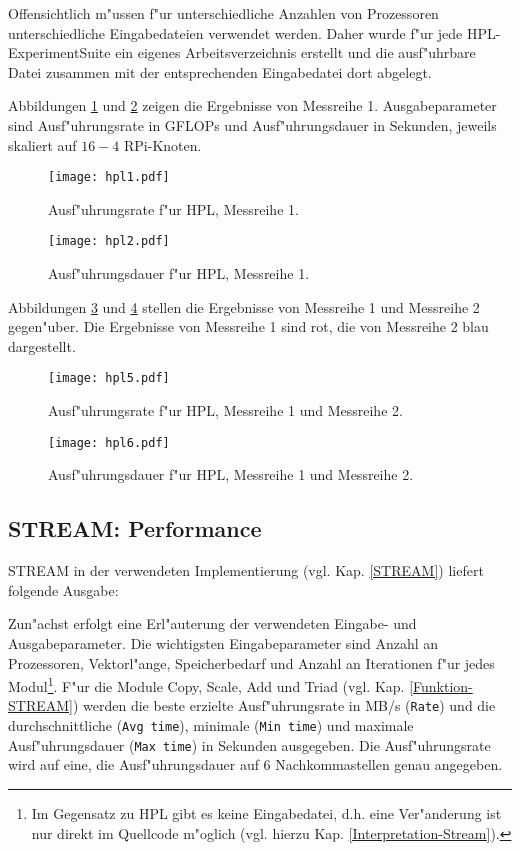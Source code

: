 Offensichtlich m"ussen f"ur unterschiedliche Anzahlen von Prozessoren unterschiedliche Eingabedateien verwendet werden. Daher wurde f"ur jede HPL-ExperimentSuite ein eigenes Arbeitsverzeichnis erstellt und die ausf"uhrbare Datei zusammen mit der entsprechenden Eingabedatei dort abgelegt. 

Abbildungen \ref{fig:hpl1} und \ref{fig:hpl2} zeigen die Ergebnisse von Messreihe 1. Ausgabeparameter sind Ausf"uhrungsrate in GFLOPs und Ausf"uhrungsdauer in Sekunden, jeweils skaliert auf $16-4$ RPi-Knoten.
\begin{figure}[H]
  \centering
  \texttt{[image: hpl1.pdf]}\\ 
  \caption{Ausf"uhrungsrate f"ur HPL, Messreihe 1.}
  \label{fig:hpl1}		
\end{figure}
\begin{figure}[H]
  \centering
  \texttt{[image: hpl2.pdf]}\\ 
  \caption{Ausf"uhrungsdauer f"ur HPL, Messreihe 1.}
  \label{fig:hpl2}		
\end{figure}
\noindent
Abbildungen \ref{fig:hpl5} und \ref{fig:hpl6} stellen die Ergebnisse von Messreihe 1 und Messreihe 2 gegen"uber. Die Ergebnisse von Messreihe 1 sind rot, die von Messreihe 2 blau dargestellt.
\begin{figure}[htb]
  \centering
  \texttt{[image: hpl5.pdf]}\\ 
  \caption{Ausf"uhrungsrate f"ur HPL, Messreihe 1 und Messreihe 2.}\label{fig:hpl5}
\end{figure}
\begin{figure}[H]
  \centering
  \texttt{[image: hpl6.pdf]}\\ 
  \caption{Ausf"uhrungsdauer f"ur HPL, Messreihe 1 und Messreihe 2.}\label{fig:hpl6}
\end{figure}
\subsection{STREAM: Performance}\label{Ergebnisse-STREAM}
STREAM in der verwendeten Implementierung (vgl. Kap. \ref{STREAM}) liefert folgende Ausgabe:

Zun"achst erfolgt eine Erl"auterung der verwendeten Eingabe- und Ausgabeparameter. Die wichtigsten Eingabeparameter sind Anzahl an Prozessoren, Vektorl"ange, Speicherbedarf und Anzahl an Iterationen f"ur jedes Modul\footnote{Im Gegensatz zu HPL gibt es keine Eingabedatei, d.h. eine Ver"anderung ist nur direkt im Quellcode m"oglich (vgl. hierzu Kap. \ref{Interpretation-Stream}).}. F"ur die Module Copy, Scale, Add und Triad (vgl. Kap. \ref{Funktion-STREAM}) werden die beste erzielte Ausf"uhrungsrate in MB/s (\texttt{Rate}) und die durchschnittliche (\texttt{Avg time}), minimale (\texttt{Min time}) und maximale Ausf"uhrungsdauer (\texttt{Max time}) in Sekunden ausgegeben. Die Ausf"uhrungsrate wird auf eine, die Ausf"uhrungsdauer auf 6 Nachkommastellen genau angegeben. 

